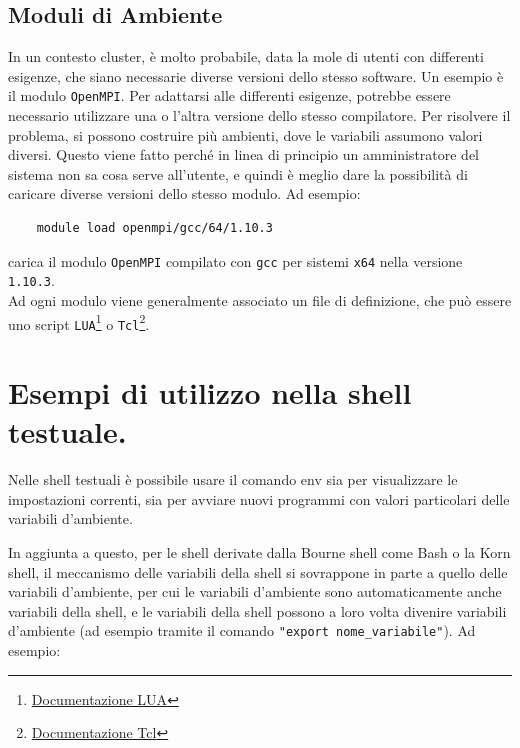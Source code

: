 \subsection{Moduli di Ambiente}
In un contesto cluster, è molto probabile, data la mole di utenti con differenti esigenze, che siano necessarie diverse versioni dello stesso software. Un esempio è il modulo \verb*|OpenMPI|. Per adattarsi alle differenti esigenze, potrebbe essere necessario utilizzare una o l'altra versione dello stesso compilatore. Per risolvere il problema, si possono costruire più ambienti, dove le variabili assumono valori diversi. Questo viene fatto perché in linea di principio un amministratore del sistema non sa cosa serve all'utente, e quindi è meglio dare la possibilità di caricare diverse versioni dello stesso modulo. Ad esempio:
\begin{verbatim}
	module load openmpi/gcc/64/1.10.3
\end{verbatim}
carica il modulo \verb*|OpenMPI| compilato con \verb*|gcc| per sistemi \verb*|x64| nella versione \verb*|1.10.3|. \\
Ad ogni modulo viene generalmente associato un file di definizione, che può essere uno script \verb*|LUA|\footnote{\hyperref{https://www.lua.org/}{docu}{LUA}{Documentazione LUA}} o \verb*|Tcl|\footnote{\hyperref{https://www.tcl.tk/}{docu}{tcl}{Documentazione Tcl}}.

\section{Esempi di utilizzo nella shell testuale.}
Nelle shell testuali è possibile usare il comando env sia per visualizzare le impostazioni correnti, sia per avviare nuovi programmi con valori particolari delle variabili d'ambiente.

In aggiunta a questo, per le shell derivate dalla Bourne shell come Bash o la Korn shell, il meccanismo delle variabili della shell si sovrappone in parte a quello delle variabili d'ambiente, per cui le variabili d'ambiente sono automaticamente anche variabili della shell, e le variabili della shell possono a loro volta divenire variabili d'ambiente (ad esempio tramite il comando \verb*|"export nome_variabile"|). Ad esempio:

